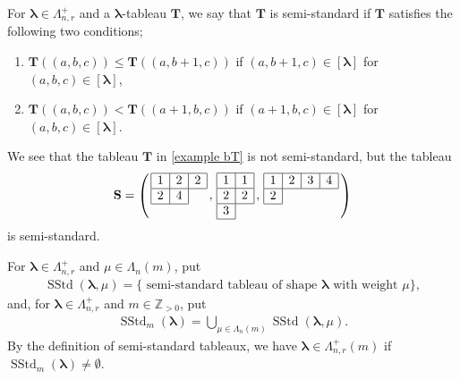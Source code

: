 \documentclass[12pt]{amsart}
\numberwithin{equation}{thm}
\newcommand\ZZ{\mathbb Z}
\newcommand\bS{\mathbf S}
\newcommand\bT{\mathbf T}
\newcommand\vL{\varLambda}
\newcommand\Bla{\boldsymbol\lambda}
\newcommand{\SStd}{\operatorname{SStd}}
\newcounter{ni}
\begin{document}
For $\Bla \in \vL_{n,r}^+$ and a $\Bla$-tableau $\bT$, 
we say that $\bT$ is semi-standard  
if $\bT$ satisfies the following two conditions; 
\begin{enumerate} 
\item 
$\bT((a,b,c)) \leq \bT((a, b+1,c))$  if $ (a,b+1,c) \in [\Bla]$ for $(a,b,c) \in [\Bla]$, 

\item 
$\bT((a,b,c)) <  \bT((a+1, b,c))$  if $ (a+1,b,c) \in [\Bla]$ for $(a,b,c) \in [\Bla]$.  
\end{enumerate}
We see that the tableau $\bT$ in \eqref{example bT} is not semi-standard, 
but the tableau 
\begin{align}
\label{ex semi-std}
\bS= \left( \, \begin{array}{|c|c|c|} \hline 1 & 2 & 2 \\ \hline 2 & 4 \\ \cline{1-2} \multicolumn{1}{c}{} \end{array} \, , 
	\, 
	\begin{array}{|c|c|c|} \hline 1 & 1 \\ \hline 2 & 2 \\ \hline 3 \\ \cline{1-1} \end{array} \, , 
	\, 
	\begin{array}{|c|c|c|c|} \hline 1 & 2 & 3 & 4 \\ \hline 2 \\ \cline{1-1} \multicolumn{1}{c}{} \end{array} 
	\, 
	\right) 
\end{align}
is semi-standard. 

For $\Bla \in \vL_{n,r}^+$ and $\mu \in \vL_n(m)$, put 
\begin{align*}
\SStd (\Bla,\mu) = \{ \text{ semi-standard tableau of shape $\Bla$ with weight $\mu$} \},  
\end{align*}
and, for $\Bla \in \vL_{n,r}^+$ and $m \in \ZZ_{>0}$, put 
\begin{align*}
\SStd_m (\Bla) = \bigcup_{\mu \in \vL_n(m)} \SStd (\Bla,\mu). 
\end{align*}
By the definition of semi-standard tableaux, 
we have 
$\Bla \in \vL_{n,r}^+(m)$ if $\SStd_m (\Bla) \not= \emptyset$. 
\end{document}
